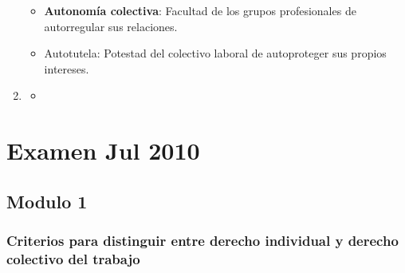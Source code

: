 \documentclass[spanish,12pt,a4paper,titlepage]{report}
\begin{document}
\begin{enumerate}
\begin{itemize}
  \item \textbf{Autonomía colectiva}: Facultad de los grupos profesionales de autorregular sus relaciones.
  \item Autotutela: Potestad del colectivo laboral de autoproteger sus propios intereses.
  \end{itemize}
\item 
  \begin{itemize}
  \item 
  \end{itemize}

\end{enumerate}

\chapter{Examen Jul 2010}

\section{Modulo 1}

\subsection{Criterios para distinguir entre derecho individual y derecho colectivo del trabajo}
\end{document}
